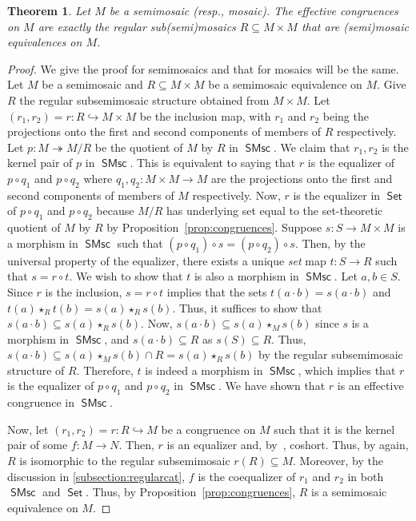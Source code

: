 \documentclass[reqno]{amsart}
\newcommand{\cat}[1]{\ensuremath{\mathsf{#1}}}
\DeclareMathOperator{\Set}{\cat{Set}}
\DeclareMathOperator{\SMsc}{\cat{SMsc}}
\numberwithin{equation}{section}
\theoremstyle{plain}
\newtheorem{theorem}[equation]{Theorem}
\theoremstyle{definition}
\begin{document}
    \begin{theorem}\label{thm:effective congruence}
        Let $M$ be a semimosaic (resp., mosaic). The effective congruences on $M$ are exactly the regular sub(semi)mosaics  $R \subseteq M \times M$ that are (semi)mosaic equivalences on $M$.
    \end{theorem}
    \begin{proof}
        We give the proof for semimosaics and that for mosaics will be the same. Let $M$ be a semimosaic and $R\subseteq M\times M$ be a semimosaic equivalence on $M$. Give $R$ the regular subsemimosaic structure obtained from $M\times M$. Let $(r_1, r_2)=r:R\hookrightarrow M\times M$ be the inclusion map, with $r_1$ and $r_2$ being the projections onto the first and second components of members of $R$ respectively. Let $p:M\twoheadrightarrow M/R$ be the quotient of $M$ by $R$ in $\SMsc$. We claim that $r_1, r_2$ is the kernel pair of $p$ in $\SMsc$. This is equivalent to saying that $r$ is the equalizer of $p\circ q_1$ and $p\circ q_2$ where $q_1, q_2: M\times M \to M$ are the projections onto the first and second components of members of $M$ respectively. Now, $r$ is the equalizer in $\Set$ of $p\circ q_1$ and $p\circ q_2$ because $M/R$ has underlying set equal to the set-theoretic quotient of $M$ by $R$ by Proposition~\ref{prop:congruences}. Suppose $s:S\to M\times M$ is a morphism in $\SMsc$ such that $(p\circ q_1) \circ s = (p\circ q_2)\circ s$. Then, by the universal property of the equalizer, there exists a unique \textit{set} map $t:S\to R$ such that $s=r\circ t$. We wish to show that $t$ is also a morphism in $\SMsc$. Let $a, b\in S$. Since $r$ is the inclusion, $s=r\circ t$ implies that the sets $t(a\cdot b) = s(a\cdot b)$ and $t(a)\star_R t(b) = s(a)\star_R s(b)$. Thus, it suffices to show that $s(a\cdot b) \subseteq s(a)\star_R s(b)$. Now, $s(a\cdot b) \subseteq s(a)\star_M s(b)$ since $s$ is a morphism in $\SMsc$, and $s(a\cdot b)\subseteq R$ as $s(S)\subseteq R$. Thus, $s(a\cdot b) \subseteq s(a)\star_M s(b) \cap R = s(a) \star_R s(b)$ by the regular subsemimosaic structure of $R$. Therefore, $t$ is indeed a morphism in $\SMsc$, which implies that $r$ is the equalizer of $p\circ q_1$ and $p\circ q_2$ in $\SMsc$. We have shown that $r$ is an effective congruence in $\SMsc$.
        
        Now, let $(r_1, r_2)=r:R\hookrightarrow M$ be a congruence on $M$ such that it is the kernel pair of some $f:M\to N$. Then, $r$ is an equalizer and, by~\cite[Theorem~3.14]{NakamuraReyes}, coshort. Thus, by \cite{NakamuraReyes} again, $R$ is isomorphic to the regular subsemimosaic $r(R)\subseteq M$. Moreover, by the discussion in \ref{subsection:regularcat}, $f$ is the coequalizer of $r_1$ and $r_2$ in both $\SMsc$ and $\Set$. Thus, by Proposition~\ref{prop:congruences}, $R$ is a semimosaic equivalence on $M$.        
    \end{proof}
\end{document}
